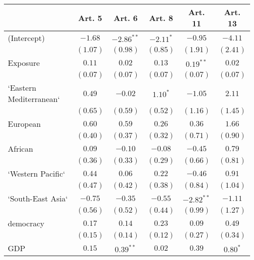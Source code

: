 
\begin{table}[!h]
\begin{center}
\begin{tabular}{l c c c c c }
\toprule
 & Art. 5 & Art. 6 & Art. 8 & Art. 11 & Art. 13 \\
\midrule
(Intercept)             & $-1.68$      & $-2.86^{**}$ & $-2.11^{*}$  & $-0.95$      & $-4.11$      \\
                        & $(1.07)$     & $(0.98)$     & $(0.85)$     & $(1.91)$     & $(2.41)$     \\
Exposure                & $0.11$       & $0.02$       & $0.13$       & $0.19^{**}$  & $0.02$       \\
                        & $(0.07)$     & $(0.07)$     & $(0.07)$     & $(0.07)$     & $(0.07)$     \\
`Eastern Mediterranean` & $0.49$       & $-0.02$      & $1.10^{*}$   & $-1.05$      & $2.11$       \\
                        & $(0.65)$     & $(0.59)$     & $(0.52)$     & $(1.16)$     & $(1.45)$     \\
European                & $0.60$       & $0.59$       & $0.26$       & $0.36$       & $1.66$       \\
                        & $(0.40)$     & $(0.37)$     & $(0.32)$     & $(0.71)$     & $(0.90)$     \\
African                 & $0.09$       & $-0.10$      & $-0.08$      & $-0.45$      & $0.79$       \\
                        & $(0.36)$     & $(0.33)$     & $(0.29)$     & $(0.66)$     & $(0.81)$     \\
`Western Pacific`       & $0.44$       & $0.06$       & $0.22$       & $-0.46$      & $0.91$       \\
                        & $(0.47)$     & $(0.42)$     & $(0.38)$     & $(0.84)$     & $(1.04)$     \\
`South-East Asia`       & $-0.75$      & $-0.35$      & $-0.55$      & $-2.82^{**}$ & $-1.11$      \\
                        & $(0.56)$     & $(0.52)$     & $(0.44)$     & $(0.99)$     & $(1.27)$     \\
democracy               & $0.17$       & $0.14$       & $0.23$       & $0.09$       & $0.49$       \\
                        & $(0.15)$     & $(0.14)$     & $(0.12)$     & $(0.27)$     & $(0.34)$     \\
GDP                     & $0.15$       & $0.39^{**}$  & $0.02$       & $0.39$       & $0.80^{*}$   \\

\end{tabular}
\end{center}
\end{table}
